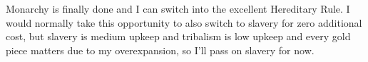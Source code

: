\documentclass[10pt]{article}
\begin{document}
Monarchy is finally done and I can switch into the excellent Hereditary Rule. I would normally take this opportunity
to also switch to slavery for zero additional cost, but slavery is medium upkeep and tribalism is low upkeep and
every gold piece matters due to my overexpansion, so I'll pass on slavery for now.
\end{document}
